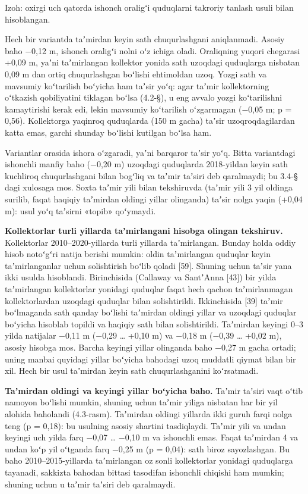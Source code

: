 Izoh: oxirgi uch qatorda ishonch oraligʻi quduqlarni takroriy tanlash
usuli bilan hisoblangan.

Hech bir variantda taʼmirdan keyin sath chuqurlashgani aniqlanmadi.
Asosiy baho −0,12 m, ishonch oraligʻi nolni oʻz ichiga oladi. Oraliqning
yuqori chegarasi +0,09 m, yaʼni taʼmirlangan kollektor yonida sath
uzoqdagi quduqlarga nisbatan 0,09 m dan ortiq chuqurlashgan boʻlishi
ehtimoldan uzoq. Yozgi sath va mavsumiy koʻtarilish boʻyicha ham taʼsir
yoʻq: agar taʼmir kollektorning oʻtkazish qobiliyatini tiklagan boʻlsa
(4.2-§), u eng avvalo yozgi koʻtarilishni kamaytirishi kerak edi, lekin
mavsumiy koʻtarilish oʻzgarmagan (−0,05 m; p = 0,56). Kollektorga
yaqinroq quduqlarda (150 m gacha) taʼsir uzoqroqdagilardan katta emas,
garchi shunday boʻlishi kutilgan boʻlsa ham.

Variantlar orasida ishora oʻzgaradi, yaʼni barqaror taʼsir yoʻq. Bitta
variantdagi ishonchli manfiy baho (−0,20 m) uzoqdagi quduqlarda
2018-yildan keyin sath kuchliroq chuqurlashgani bilan bogʻliq va taʼmir
taʼsiri deb qaralmaydi; bu 3.4-§ dagi xulosaga mos. Soxta taʼmir yili
bilan tekshiruvda (taʼmir yili 3 yil oldinga surilib, faqat haqiqiy
taʼmirdan oldingi yillar olinganda) taʼsir nolga yaqin (+0,04 m): usul
yoʻq taʼsirni «topib» qoʻymaydi.

\textbf{Kollektorlar turli yillarda taʼmirlangani hisobga olingan
tekshiruv.} Kollektorlar 2010--2020-yillarda turli yillarda
taʼmirlangan. Bunday holda oddiy hisob notoʻgʻri natija berishi mumkin:
oldin taʼmirlangan quduqlar keyin taʼmirlanganlar uchun solishtirish
boʻlib qoladi {[}59{]}. Shuning uchun taʼsir yana ikki usulda
hisoblandi. Birinchisida (Callaway va SantʼAnna {[}43{]}) bir yilda
taʼmirlangan kollektorlar yonidagi quduqlar faqat hech qachon
taʼmirlanmagan kollektorlardan uzoqdagi quduqlar bilan solishtirildi.
Ikkinchisida {[}39{]} taʼmir boʻlmaganda sath qanday boʻlishi taʼmirdan
oldingi yillar va uzoqdagi quduqlar boʻyicha hisoblab topildi va haqiqiy
sath bilan solishtirildi. Taʼmirdan keyingi 0--3 yilda natijalar −0,11 m
(−0,29 \ldots{} +0,10 m) va −0,18 m (−0,39 \ldots{} +0,02 m), asosiy
hisobga mos. Barcha keyingi yillar olinganda baho −0,27 m gacha ortadi;
uning manbai quyidagi yillar boʻyicha bahodagi uzoq muddatli qiymat
bilan bir xil. Hech bir usul taʼmirdan keyin sath chuqurlashganini
koʻrsatmadi.

\textbf{Taʼmirdan oldingi va keyingi yillar boʻyicha baho.} Taʼmir
taʼsiri vaqt oʻtib namoyon boʻlishi mumkin, shuning uchun taʼmir yiliga
nisbatan har bir yil alohida baholandi (4.3-rasm). Taʼmirdan oldingi
yillarda ikki guruh farqi nolga teng (p = 0,18): bu usulning asosiy
shartini tasdiqlaydi. Taʼmir yili va undan keyingi uch yilda farq −0,07
\ldots{} −0,10 m va ishonchli emas. Faqat taʼmirdan 4 va undan koʻp yil
oʻtganda farq −0,25 m (p = 0,04): sath biroz sayozlashgan. Bu baho
2010--2015-yillarda taʼmirlangan oz sonli kollektorlar yonidagi
quduqlarga tayanadi, sakkizta bahodan bittasi tasodifan ishonchli
chiqishi ham mumkin; shuning uchun u taʼmir taʼsiri deb qaralmaydi.

